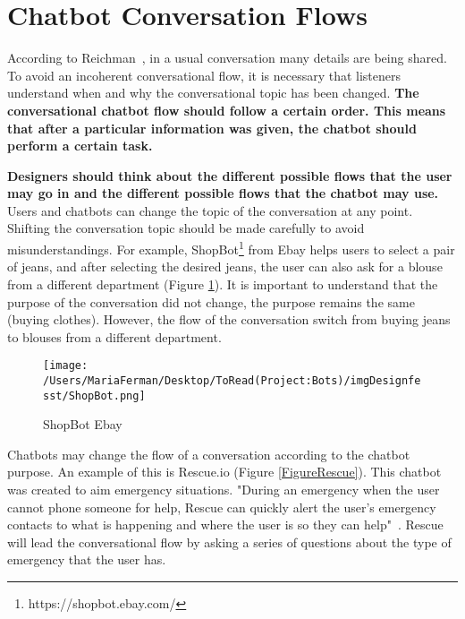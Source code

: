 \documentclass[a4paper,10pt]{article}
\begin{document}
\section{Chatbot Conversation Flows}
According to Reichman~\cite{reichman1985getting}, in a usual conversation many details are being shared. To avoid an incoherent conversational flow, it is necessary that listeners understand when and why the conversational topic has been changed. \textbf{The conversational chatbot flow should follow a certain order. This means that after a particular information was given, the chatbot should perform a certain task.} 

\textbf{Designers should think about the different possible flows that the user may go in and the different possible flows that the chatbot may use.} Users and chatbots can change the topic of the conversation at any point. Shifting the conversation topic should be made carefully to avoid misunderstandings. For example, ShopBot\footnote{https://shopbot.ebay.com/} from Ebay helps users to select a pair of jeans, and after selecting the desired jeans, the user can also ask for a blouse from a different department (Figure \ref{FigureEbay}). It is important to understand that the purpose of the conversation did not change, the purpose remains the same (buying clothes). However, the flow of the conversation switch from buying jeans to blouses from a different department.

\begin{figure}
\centering
\texttt{[image: /Users/MariaFerman/Desktop/ToRead(Project:Bots)/imgDesignfesst/ShopBot.png]}
\caption{ShopBot Ebay}
\label{FigureEbay}
\end{figure}


Chatbots may change the flow of a conversation according to the chatbot purpose. An example of this is Rescue.io (Figure \ref{FigureRescue}). This chatbot was created to aim emergency situations. "During an emergency when the user cannot phone someone for help, Rescue can quickly alert the user's emergency contacts to what is happening and where the user is so they can help"~\cite{Rescue}. Rescue will lead the conversational flow by asking a series of questions about the type of emergency that the user has. 
\end{document}
